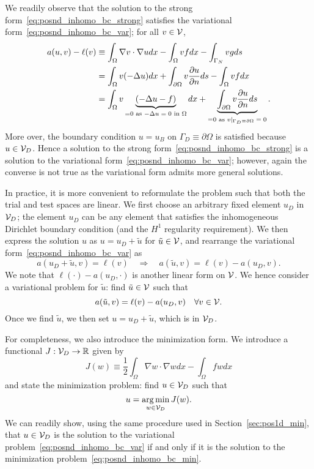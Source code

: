 We readily observe that the solution to the strong form~\eqref{eq:posnd_inhomo_bc_strong} satisfies the variational form~\eqref{eq:posnd_inhomo_bc_var};  for all $v \in \mathcal{V}$,
\begin{align*}
  a(u,v) - \ell(v)
  &\equiv \int_\Omega \nabla v \cdot \nabla u dx - \int_\Omega vf dx - \int_{\Gamma_N} vg ds
  \\
  &= \int_\Omega v (-\Delta u) dx + \int_{\partial \Omega} v \frac{\partial u}{\partial n} ds  - \int_\Omega vf dx 
  \\
  &= \int_\Omega v \underbrace{ (-\Delta u - f) }_{= 0 \text{ as $-\Delta u=  0$ in $\Omega$}} dx
  + \underbrace{ \int_{\partial \Omega} v \frac{\partial u}{\partial n} ds }_{= 0 \text{ as $v|_{\Gamma_D \equiv \partial \Omega} = 0$}}.
\end{align*}
More over, the boundary condition $u = u_B$ on $\Gamma_D \equiv \partial \Omega$ is satisfied because $u \in \mathcal{V}_D$. 
Hence a solution to the strong form~\eqref{eq:posnd_inhomo_bc_strong} is a solution to the variational form~\eqref{eq:posnd_inhomo_bc_var}; however, again the converse is not true as the variational form admits more general solutions.

In practice, it is more convenient to reformulate the problem such that both the trial and test spaces are linear.  We first choose an arbitrary fixed element $u_D$ in $\mathcal{V}_D$; the element $u_D$ can be any element that satisfies the inhomogeneous Dirichlet boundary condition (and the $H^1$ regularity requirement). We then express the solution $u$ as $u = u_D + \tilde u$ for $\tilde u \in \mathcal{V}$, and rearrange the variational form~\eqref{eq:posnd_inhomo_bc_var} as
\begin{equation*}
  a(u_D + \tilde u,v) = \ell(v) \quad \Rightarrow \quad
  a(\tilde u,v) = \ell(v) - a(u_D,v).
\end{equation*}
We note that $\ell(\cdot) - a(u_D,\cdot)$ is another linear form on $\mathcal{V}$. We hence consider a variational problem for $\tilde u$: find $\tilde u \in \mathcal{V}$ such that
\begin{equation*}
  a(\tilde u,v) = \ell(v) - a(u_D,v) \quad \forall v \in \mathcal{V}.
\end{equation*}
Once we find $\tilde u$, we then set $u = u_D + \tilde u$, which is in $\mathcal{V}_D$.

For completeness, we also introduce the minimization form.  We introduce a functional $J: \mathcal{V}_D \to \mathbb{R}$ given by
\begin{equation}
  J(w) \equiv \frac{1}{2} \int_{\Omega} \nabla w \cdot \nabla w dx - \int_\Omega f w dx
  \label{eq:posnd_inhomo_bc_min_func}
\end{equation}
and state the minimization problem: find $u \in \mathcal{V}_D$ such that
\begin{equation}
  u = \operatorname*{arg\,min}_{w \in \mathcal{V}_D} J(w).
  \label{eq:posnd_inhomo_bc_min}
\end{equation}
We can readily show, using the same procedure used in Section~\ref{sec:pos1d_min}, that $u \in \mathcal{V}_D$ is the solution to the variational problem~\eqref{eq:posnd_inhomo_bc_var} if and only if it is the solution to the minimization problem~\eqref{eq:posnd_inhomo_bc_min}.

